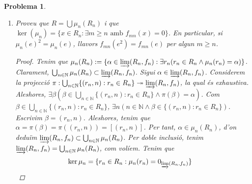 \documentclass[compress]{article}
\newtheorem{problema}{Problema}
\theoremstyle{definition}
\begin{document}
\begin{problema}
\begin{enumerate}
\begin{proof}
            Definim $\mu_{n}:R_{n}\rightarrow\varinjlim(R_{n},f_{n})$ via $\mu_{n}(r):=[(r,n)]$. Clarament esta ben definida i és morfisme d'anells (inclusió $R_{n}\hookrightarrow\bigsqcup_{n\in\mathbb{N}}R_{n}$ i composem amb la projecció $\bigsqcup_{n\in\mathbb{N}}R_{n}\twoheadrightarrow\varinjlim(R_{n},f_{n})$). Si $m>n$, tenim que
            \begin{align*}
                \mu_{m}(f_{nm}(r))
                &=[(f_{nm}(r),m)]
                &\quad&\textrm{(Per definició de $\mu_{m}$)}\\
                &=[(r,n)]
                &\quad&\textrm{($(f_{nm}(r),m)\sim(r,n)$)}\\
                &=\mu_{n}(r)
                &\quad&\textrm{(Per definició de $\mu_{n}$)}
            \end{align*}
            com volíem veure.
        \end{proof}
        \item Proveu que $R=\bigcup\mu_{n}(R_{n})$ i que $\ker(\mu_{n})=\{x\in R_{n}:\exists m\geq n\textrm{ amb }f_{mn}(x)=0\}$. En particular, si $\mu_{n}(e)^{2}=\mu_{n}(e)$, llavors $f_{mn}(e^{2})=f_{mn}(e)$ per algun $m\geq n$.
        \begin{proof}
            Tenim que $\mu_{n}(R_{n}):=\{\alpha\in\varinjlim(R_{n},f_{n}):\exists r_{n}(r_{n}\in R_{n}\land\mu_{n}(r_{n})=\alpha)\}$. Clarament, $\bigcup_{n\in\mathbb{N}}\mu_{n}(R_{n})\subset\varinjlim(R_{n},f_{n})$.\newline
            Sigui $\alpha\in\varinjlim(R_{n},f_{n})$. Considerem la projecció $\pi:\bigcup_{n\in\mathbb{N}}\{(r_{n},n):r_{n}\in R_{n}\}\twoheadrightarrow\varinjlim(R_{n},f_{n})$, la qual és exhaustiva. Aleshores, $\exists\beta(\beta\in\bigcup_{n\in\mathbb{N}}\{(r_{n},n):r_{n}\in R_{n}\}\land\pi(\beta)=\alpha)$. Com $\beta\in\bigcup_{n\in\mathbb{N}}\{(r_{n},n):r_{n}\in R_{n}\}$, $\exists n(n\in\mathbb{N}\land\beta\in\{(r_{n},n):r_{n}\in R_{n}\})$. Escrivim $\beta=(r_{n},n)$. Aleshores, tenim que $\alpha=\pi(\beta)=\pi((r_{n},n))=[(r_{n},n)]$. Per tant, $\alpha\in\mu_{n}(R_{n})$, d'on deduïm $\varinjlim(R_{n},f_{n})\subset\bigcup_{n\in\mathbb{N}}\mu_{n}(R_{n})$.\newline
            Per doble inclusió, tenim $\varinjlim(R_{n},f_{n})=\bigcup_{n\in\mathbb{N}}\mu_{n}(R_{n})$, com volíem.\newline
            Tenim que
            \begin{align*}
                \ker{\mu_{n}}
                &=\{r_{n}\in R_{n}:\mu_{n}(r_{n})=0_{\varinjlim(R_{n},f_{n})}\}

\end{align*}
\end{proof}
\end{enumerate}
\end{problema}
\end{document}
